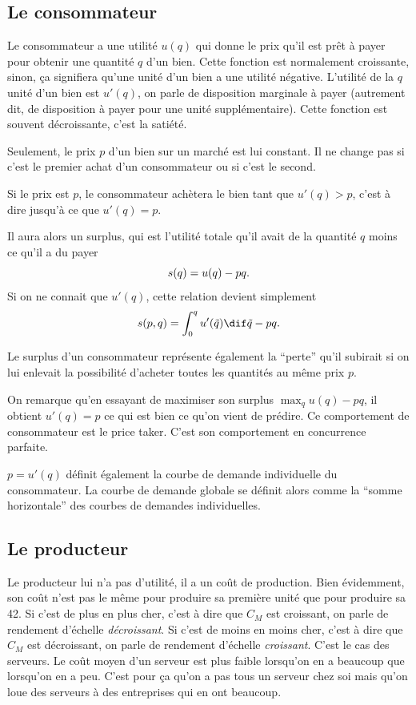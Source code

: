 \subsection{Le consommateur}
Le consommateur a une utilité $u(q)$ qui donne le prix qu'il est prêt à payer
pour obtenir une quantité $q$ d'un bien.
Cette fonction est normalement croissante, sinon, ça signifiera qu'une unité
d'un bien a une utilité négative.
L'utilité de la $q$\ieme{} unité d'un bien est $u'(q)$, on
parle de disposition marginale à payer (autrement dit, de disposition
à payer pour une unité supplémentaire).
Cette fonction est souvent décroissante, c'est la satiété.

Seulement, le prix $p$ d'un bien sur un marché est lui constant.
Il ne change pas si c'est le premier achat d'un consommateur ou si
c'est le second.

Si le prix est $p$, le consommateur achètera le bien tant que
$u'(q) > p$, c'est à dire jusqu'à ce que $u'(q) = p$.

Il aura alors un surplus, qui est l'utilité totale qu'il avait
de la quantité $q$ moins ce qu'il a du payer
\[ s(q) = u(q) - pq. \]
Si on ne connait que $u'(q)$, cette relation devient simplement
\begin{equation}
  \label{eq:surplus_1cons}
  \surplus(p, q) = \int_0^q u'(\tilde{q})\dif \tilde{q} - pq.
\end{equation}

Le surplus d'un consommateur représente également la ``perte'' qu'il
subirait si on lui enlevait la possibilité d'acheter toutes
les quantités au même prix $p$.

On remarque qu'en essayant de maximiser son surplus $\max_q u(q) - pq$,
il obtient $u'(q) = p$ ce qui est bien ce qu'on vient de prédire.
Ce comportement de consommateur est le price taker.
C'est son comportement en concurrence parfaite.

$p = u'(q)$ définit également la courbe de demande individuelle
du consommateur. La courbe de demande globale se définit alors
comme la ``somme horizontale'' des courbes de demandes individuelles.

\subsection{Le producteur}
Le producteur lui n'a pas d'utilité, il a un coût de production.
Bien évidemment, son coût n'est pas le même pour produire sa première unité
que pour produire sa 42\ieme{}.
Si c'est de plus en plus cher,
c'est à dire que $C_M$ est croissant,
on parle de rendement d'échelle \emph{décroissant}.
Si c'est de moins en moins cher,
c'est à dire que $C_M$ est décroissant,
on parle de rendement d'échelle \emph{croissant}.
C'est le cas des serveurs.
Le coût moyen d'un serveur est plus faible lorsqu'on en a beaucoup que
lorsqu'on en a peu.
C'est pour ça qu'on a pas tous un serveur chez soi mais qu'on loue
des serveurs à des entreprises qui en ont beaucoup.

